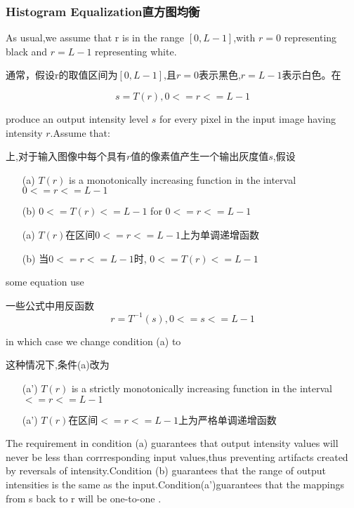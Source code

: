 \documentclass[a4paper,12pt]{article}
\numberwithin{equation}{section}%
\begin{document}
\subsubsection{Histogram Equalization直方图均衡}

As usual,we assume that r is in the range $[0,L-1]$,with $r=0$ representing black and $r=L-1$ representing white. 

通常，假设r的取值区间为$[0,L-1]$,且$r=0$表示黑色,$r=L-1$表示白色。在

\begin{equation} \label{3.3}   
 s=T(r) ,0<=r<=L-1
\end{equation}

produce an output intensity level $s$ for every pixel in the input image having intensity $r$.Assume that:

上,对于输入图像中每个具有$r$值的像素值产生一个输出灰度值$s$,假设

\begin{enumerate}
\item[(a)] $T(r)$ is a monotonically increasing function in the interval $0<=r<=L-1$
\item[(b)] $0<=T(r)<=L-1$ for $0<=r<=L-1$
\end{enumerate}
\begin{enumerate}
\item[(a)] $T(r)$在区间$0<=r<=L-1$上为单调递增函数
\item[(b)] 当$0<=r<=L-1$时, $0<=T(r)<=L-1$
\end{enumerate}

some equation use

一些公式中用反函数
\begin{equation}  \label{3.4}  %
 r=T^{-1}(s),0<=s<=L-1 
\end{equation}

in which case we change condition (a) to 

这种情况下,条件(a)改为

\begin{enumerate}
\item[(a')] $T(r)$ is a strictly monotonically increasing function in the interval  $<=r<=L-1$
\end{enumerate}

\begin{enumerate}
\item[(a')] $T(r)$在区间$<=r<=L-1$上为严格单调递增函数
\end{enumerate}

The requirement in condition (a) guarantees that output intensity values will never be less than corrresponding input values,thus preventing artifacts created by reversals of intensity.Condition (b) guarantees that the range of output intensities is the same as the input.Condition(a')guarantees that the mappings from s back to r will be one-to-one .
\end{document}
